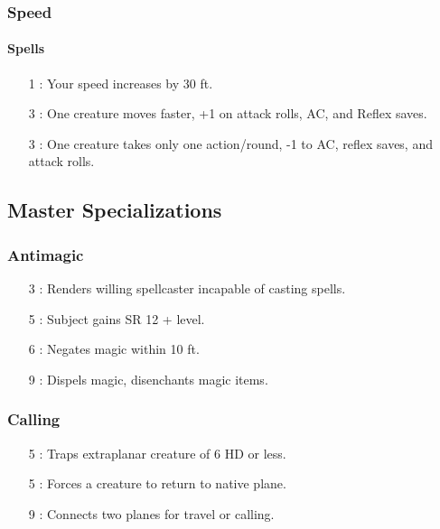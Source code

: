 \subsubsection{Speed}
\paragraph{Spells}
\begin{itemize}
 \item[1] : Your speed increases by 30 ft.
 \item[3] : One creature moves faster, +1 on attack rolls, AC, and Reflex saves.
 \item[3] : One creature takes only one action/round, -1 to AC, reflex saves, and attack rolls.
\end{itemize}


\subsection{Master Specializations}
\subsubsection{Antimagic}
\begin{itemize}
 \item[3] : Renders willing spellcaster incapable of casting spells.
 \item[5] : Subject gains SR 12 + level.
 \item[6] : Negates magic within 10 ft.
 \item[9] : Dispels magic, disenchants magic items.
\end{itemize}

\subsubsection{Calling}
\begin{itemize}
 \item[5] : Traps extraplanar creature of 6 HD or less.
 \item[5] : Forces a creature to return to native plane.
 \item[9] : Connects two planes for travel or calling.
\end{itemize}

